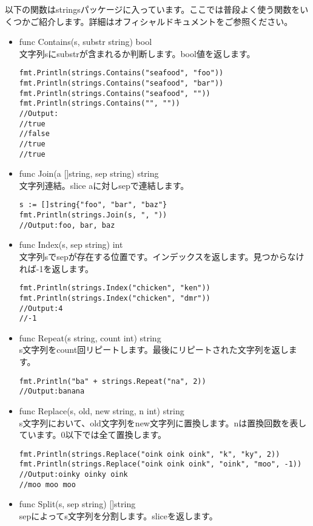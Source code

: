 以下の関数はstringsパッケージに入っています。ここでは普段よく使う関数をいくつかご紹介します。詳細はオフィシャルドキュメントをご参照ください。

\begin{itemize}
\item func Contains(s, substr string) bool\\ 文字列sにsubstrが含まれるか判断します。bool値を返します。
\begin{lstlisting}[numbers=none]
fmt.Println(strings.Contains("seafood", "foo"))
fmt.Println(strings.Contains("seafood", "bar"))
fmt.Println(strings.Contains("seafood", ""))
fmt.Println(strings.Contains("", ""))
//Output:
//true
//false
//true
//true
\end{lstlisting}
\item func Join(a []string, sep string) string\\ 文字列連結。slice aに対しsepで連結します。
\begin{lstlisting}[numbers=none]
s := []string{"foo", "bar", "baz"}
fmt.Println(strings.Join(s, ", "))
//Output:foo, bar, baz
\end{lstlisting}
\item func Index(s, sep string) int \\ 文字列sでsepが存在する位置です。インデックスを返します。見つからなければ-1を返します。
\begin{lstlisting}[numbers=none]
fmt.Println(strings.Index("chicken", "ken"))
fmt.Println(strings.Index("chicken", "dmr"))
//Output:4
//-1
\end{lstlisting}
\item func Repeat(s string, count int) string\\ s文字列をcount回リピートします。最後にリピートされた文字列を返します。
\begin{lstlisting}[numbers=none]
fmt.Println("ba" + strings.Repeat("na", 2))
//Output:banana
\end{lstlisting}
\item func Replace(s, old, new string, n int) string\\ s文字列において、old文字列をnew文字列に置換します。nは置換回数を表しています。0以下では全て置換します。
\begin{lstlisting}[numbers=none]
fmt.Println(strings.Replace("oink oink oink", "k", "ky", 2))
fmt.Println(strings.Replace("oink oink oink", "oink", "moo", -1))
//Output:oinky oinky oink
//moo moo moo
\end{lstlisting}
\item func Split(s, sep string) []string\\sepによってs文字列を分割します。sliceを返します。

\end{itemize}
